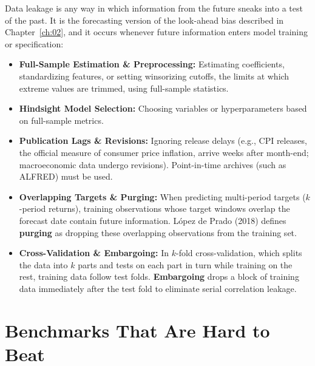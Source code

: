 Data leakage is any way in which information from the future sneaks into a test of the past. It is the forecasting version of the look-ahead bias described in Chapter~\ref{ch:02}, and it occurs whenever future information enters model training or specification:
\begin{itemize}
  \item \textbf{Full-Sample Estimation \& Preprocessing:} Estimating coefficients, standardizing features, or setting winsorizing cutoffs, the limits at which extreme values are trimmed, using full-sample statistics.
  \item \textbf{Hindsight Model Selection:} Choosing variables or hyperparameters based on full-sample metrics.
  \item \textbf{Publication Lags \& Revisions:} Ignoring release delays (e.g., CPI releases, the official measure of consumer price inflation, arrive weeks after month-end; macroeconomic data undergo revisions). Point-in-time archives (such as ALFRED) must be used.
  \item \textbf{Overlapping Targets \& Purging:} When predicting multi-period targets ($k$-period returns), training observations whose target windows overlap the forecast date contain future information. López de Prado (2018) defines \textbf{purging} as dropping these overlapping observations from the training set.
  \item \textbf{Cross-Validation \& Embargoing:} In $k$-fold cross-validation, which splits the data into $k$ parts and tests on each part in turn while training on the rest, training data follow test folds. \textbf{Embargoing} drops a block of training data immediately after the test fold to eliminate serial correlation leakage.
\end{itemize}

\section{Benchmarks That Are Hard to Beat}
\label{sec:09-benchmarks}

